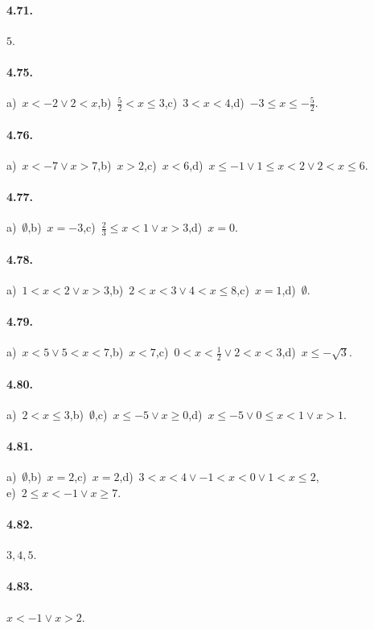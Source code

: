 \paragraph{4.71.} $ 5 $.

\paragraph{4.75.} a)~$x<-2\vee 2<x$,\quad b)~$\frac 5 2<x\le 3$,\quad c)~$3<x<4$,\quad d)~$-3\le x\le -\frac 5 2$.

\paragraph{4.76.} a)~$x<-7\vee x>7$,\quad b)~$x>2$,\quad c)~$x<6$,\quad d)~$x\le -1\vee 1\le x<2\vee 2<x\le 6$.

\paragraph{4.77.} a)~$\emptyset $,\quad b)~$x=-3$,\quad c)~$\frac 2 3\le x<1\vee x>3$,\quad d)~$x=0$.

\paragraph{4.78.} a)~$1<x<2\vee x>3$,\quad b)~$2<x<3\vee 4<x\le 8$,\quad c)~$x=1$,\quad d)~$\emptyset $.

\paragraph{4.79.} a)~$x<5\vee 5<x<7$,\quad b)~$x<7$,\quad c)~$0<x<\frac 1 2\vee 2<x<3$,\quad d)~$x\le -\sqrt 3$.

\paragraph{4.80.} a)~$2<x\le 3$,\quad b)~$\emptyset $,\quad c)~$x\le -5\vee x\ge 0$,\quad d)~$x\le -5\vee 0\le x<1\vee x>1$.

\paragraph{4.81.} a)~$\emptyset $,\quad b)~$x=2$,\quad c)~$x=2$,\quad d)~$3<x<4\vee -1<x<0\vee 1<x\le 2$,\protect\\
e)~$2\le x<-1\vee x\ge 7$.

\paragraph{4.82.} $3, 4, 5$.

\paragraph{4.83.} $x<-1\vee x>2$.
